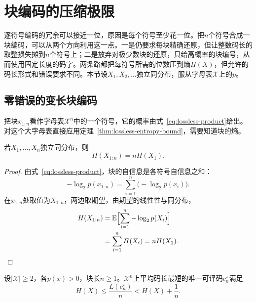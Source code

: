 \section{块编码的压缩极限}
\label{sec:lossless-block-limits}

逐符号编码的冗余可以接近一位，原因是每个符号至少花一位。把$n$个符号合成一块编码，可以从两个方向利用这一点。一是仍要求每块精确还原，但让整数码长的取整损失摊到$n$个符号上；二是放弃对极少数块的还原，只给高概率的块编号，从而使用固定长度的码字。两条路都把每符号所需的位数压到熵$H(X)$，但允许的码长形式和错误要求不同。本节设$X_1,X_2,\dots$独立同分布，服从字母表$\mathcal{X}$上的$p$。

\subsection{零错误的变长块编码}
\label{sec:lossless-variable-block}

把块$x_{1:n}$看作字母表$\mathcal{X}^n$中的一个符号，它的概率由式~\eqref{eq:lossless-product}给出。对这个大字母表直接应用定理~\ref{thm:lossless-entropy-bound}，需要知道块的熵。

\begin{lemma}[独立块的熵]
\label{lem:lossless-block-entropy}
若$X_1,\dots,X_n$独立同分布，则
\begin{equation}
 H(X_{1:n})=nH(X_1).
 \label{eq:lossless-block-entropy}
\end{equation}
\end{lemma}

\begin{proof}
由式~\eqref{eq:lossless-product}，块的自信息是各符号自信息之和：
\[
 -\log_2p(x_{1:n})=\sum_{i=1}^{n}\bigl(-\log_2p(x_i)\bigr).
\]
在$x_{1:n}$处取值为$X_{1:n}$，两边取期望，由期望的线性性与同分布，
\[
 \begin{aligned}
 H(X_{1:n})&=\mathbb{E}\Bigl[\sum_{i=1}^{n}-\log_2p(X_i)\Bigr]\\
 &=\sum_{i=1}^{n}H(X_i)=nH(X_1). \qedhere
 \end{aligned}
\]
\end{proof}

\begin{theorem}[变长块编码]
\label{thm:lossless-variable-block}
设$\lvert\mathcal{X}\rvert\geq2$，各$p(x)>0$，块长$n\geq1$。$\mathcal{X}^n$上平均码长最短的唯一可译码$c_n^{\star}$满足
\begin{equation}
 H(X)\leq\frac{L(c_n^{\star})}{n}<H(X)+\frac1n .
 \label{eq:lossless-block-bound}
\end{equation}
\end{theorem}

